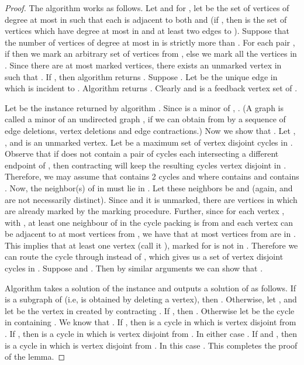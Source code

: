 \begin{proof}
The algorithm  works as follows. 
 Let  and  for , let  be the set of vertices of degree at most  in  such that each  is adjacent to both  and  (if , then 
is the set of vertices which have degree at most  in  and at least two edges to ). Suppose that the number of vertices of degree at most  in  is strictly more than
. For each pair , if  then we mark an arbitrary  set of 
 vertices from , else we mark all the vertices in . Since there are at most  marked vertices,
there exists an unmarked vertex  in  such that 
 . 
If , then algorithm 
returns .
Suppose . Let   be the unique edge in  which is incident to . Algorithm   
returns . Clearly  and  is a feedback vertex set of . 

 Let  be the instance returned by algorithm .
Since  is a minor of , .   (A graph  is called a minor of an undirected  graph , if we  can obtain  from  by a sequence of edge deletions, vertex deletions and edge contractions.) 
Now we show that . 
Let , ,  and  is an unmarked vertex.   
 Let  be a maximum set of vertex disjoint cycles in . Observe that if  does not contain a pair of cycles each intersecting a different endpoint of , then contracting  will keep the resulting cycles vertex disjoint in . Therefore, we may assume that  contains 2 cycles  and  where  contains  and  contains . Now, the neighbor(s) of  in  must lie in . Let these neighbors be  and  (again,  and  are not necessarily distinct). Since  and it is unmarked, there are  vertices in  which are already marked by the marking procedure. 
Further, since for each vertex , with , 
at least one neighbour of  in the cycle packing  is from   and each  
vertex   can be adjacent to at most  vertices from 
, we have that at most  vertices from  are in . This implies that 
at least one vertex (call it ), marked for  is not in   . 
Therefore we can route the cycle  through  instead of , which gives us a set of  vertex disjoint cycles in . 
Suppose  and . Then by similar arguments we can show that 
. 

Algorithm  takes a solution  of the instance  and outputs a solution  of  
as follows. If  is a subgraph of  (i.e,  is obtained by deleting a vertex), then . Otherwise, 
let ,  and let  be the vertex in  created by contracting . If , then 
. Otherwise let  be the cycle in  containing . 
We know that . 
If , then  is a cycle in  which is vertex disjoint 
from . If ,  then  is a cycle in  which is vertex disjoint 
from . In either case . 
If  and , then  is 
a cycle in  which is vertex disjoint 
from . In this case .
This completes the proof of the lemma.
\end{proof}




